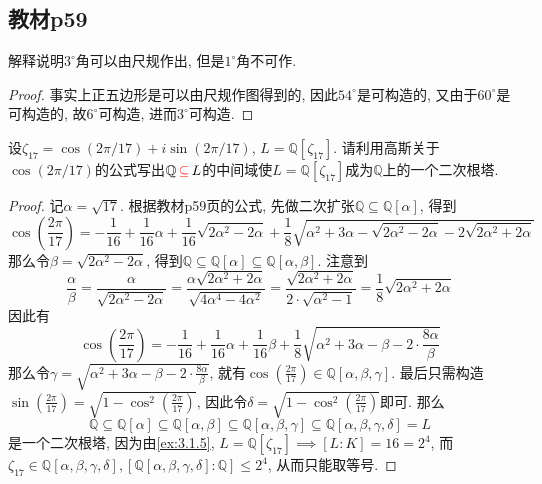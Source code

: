 \subsection{教材p59}

\begin{problem}
    解释说明$3^\circ$角可以由尺规作出, 但是$1^\circ$角不可作.
\end{problem}

\begin{proof}
    事实上正五边形是可以由尺规作图得到的, 因此$54^\circ$是可构造的, 又由于$60^\circ$是可构造的, 故$6^\circ$可构造, 进而$3^\circ$可构造.
\end{proof}

\begin{problem}
    设$\zeta_{17} = \cos(2\pi/17) + i\sin(2\pi/17)$, $L = \mathbb{Q}[\zeta_{17}]$. 请利用高斯关于$\cos(2\pi/17)$的公式写出$\mathbb{Q} \,\textcolor{red}{\subseteq}\, L$的中间域使$L = \mathbb{Q}[\zeta_{17}]$成为$\mathbb{Q}$上的一个二次根塔.
\end{problem}

\begin{proof}
    记$\alpha = \sqrt{17}$. 根据教材p59页的公式, 先做二次扩张$\mathbb{Q} \subseteq \mathbb{Q}[\alpha]$, 得到
    \[
        \cos(\frac{2\pi}{17}) = -\frac{1}{16} + \frac{1}{16}\alpha + \frac{1}{16}\sqrt{2\alpha^2 - 2\alpha} + \frac{1}{8}\sqrt{\alpha^2 + 3\alpha - \sqrt{2\alpha^2 - 2\alpha} - 2\sqrt{2\alpha^2 + 2\alpha}}
    \]
    那么令$\beta = \sqrt{2\alpha^2 - 2\alpha}$, 得到$\mathbb{Q} \subseteq \mathbb{Q}[\alpha] \subseteq \mathbb{Q}[\alpha, \beta]$. 注意到
    \[
        \frac{\alpha}{\beta} = \frac{\alpha}{\sqrt{2\alpha^2 - 2\alpha}} = \frac{\alpha\sqrt{2\alpha^2 + 2\alpha}}{\sqrt{4\alpha^4 - 4\alpha^2}} = \frac{\sqrt{2\alpha^2 + 2\alpha}}{2 \cdot \sqrt{\alpha^2 - 1}} = \frac{1}{8}\sqrt{2\alpha^2 + 2\alpha} 
    \]
    因此有
    \[
        \cos(\frac{2\pi}{17}) = -\frac{1}{16} + \frac{1}{16}\alpha + \frac{1}{16}\beta + \frac{1}{8}\sqrt{\alpha^2 + 3\alpha - \beta - 2 \cdot \frac{8\alpha}{\beta}}
    \]
    那么令$\gamma = \sqrt{\alpha^2 + 3\alpha - \beta - 2 \cdot \frac{8\alpha}{\beta}}$, 就有$\cos(\frac{2\pi}{17}) \in \mathbb{Q}[\alpha, \beta, \gamma]$. 最后只需构造$\sin(\frac{2\pi}{17}) = \sqrt{1 - \cos^2(\frac{2\pi}{17})}$, 因此令$\delta = \sqrt{1 - \cos^2(\frac{2\pi}{17})}$即可. 那么
    \[
        \mathbb{Q} \subseteq \mathbb{Q}[\alpha] \subseteq \mathbb{Q}[\alpha, \beta] \subseteq \mathbb{Q}[\alpha, \beta, \gamma] \subseteq \mathbb{Q}[\alpha, \beta, \gamma, \delta] = L
    \]
    是一个二次根塔, 因为由\ref{ex:3.1.5}, $L = \mathbb{Q}[\zeta_{17}] \implies [L:K] = 16 = 2^4$, 而$\zeta_{17} \in \mathbb{Q}[\alpha, \beta, \gamma, \delta], \left[\mathbb{Q}[\alpha, \beta, \gamma, \delta]:\mathbb{Q}\right]\leqslant 2^4$, 从而只能取等号.
\end{proof}